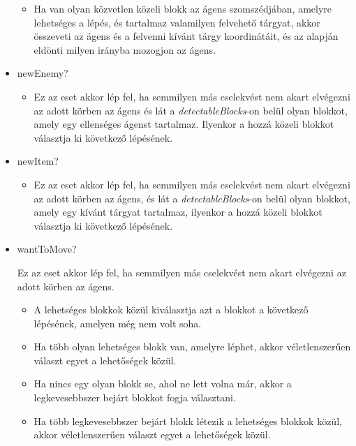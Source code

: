 \begin{itemize}
    \begin{itemize}
        \item Ha van olyan közvetlen közeli blokk az ágens szomszédjában, amelyre lehetséges a lépés, és tartalmaz valamilyen felvehető tárgyat,
        akkor összeveti az ágens és a felvenni kívánt tárgy koordinátáit, és az alapján eldönti milyen irányba mozogjon az ágens. 
    \end{itemize}

    \item newEnemy?

    \begin{itemize}
        \item Ez az eset akkor lép fel, ha semmilyen más cselekvést nem akart elvégezni az adott körben az ágens és lát a \textit{detectableBlocks}-on belül olyan blokkot,
        amely egy ellenséges ágenst tartalmaz. Ilyenkor a hozzá közeli blokkot választja ki következő lépésének.
    \end{itemize}

\newpage

    \item newItem?

    \begin{itemize}
        \item Ez az eset akkor lép fel, ha semmilyen más cselekvést nem akart elvégezni az adott körben az ágens, és lát a \textit{detectableBlocks}-on belül olyan blokkot,
        amely egy kívánt tárgyat tartalmaz, ilyenkor a hozzá közeli blokkot választja ki következő lépésének.
    \end{itemize}

    \item wantToMove?
    
    Ez az eset akkor lép fel, ha semmilyen más cselekvést nem akart elvégezni az adott körben az ágens.

    \begin{itemize}
        \item A lehetséges blokkok közül kiválasztja azt a blokkot a következő lépésének, amelyen még nem volt soha.
        \item Ha több olyan lehetséges blokk van, amelyre léphet, akkor véletlenszerűen választ egyet a lehetőségek közül.
        \item Ha nincs egy olyan blokk se, ahol ne lett volna már, akkor a legkevesebbszer bejárt blokkot fogja választani.
        \item Ha több legkevesebbszer bejárt blokk létezik a lehetséges blokkok közül, akkor véletlenszerűen választ egyet a lehetőségek közül.
    \end{itemize}
\end{itemize}

